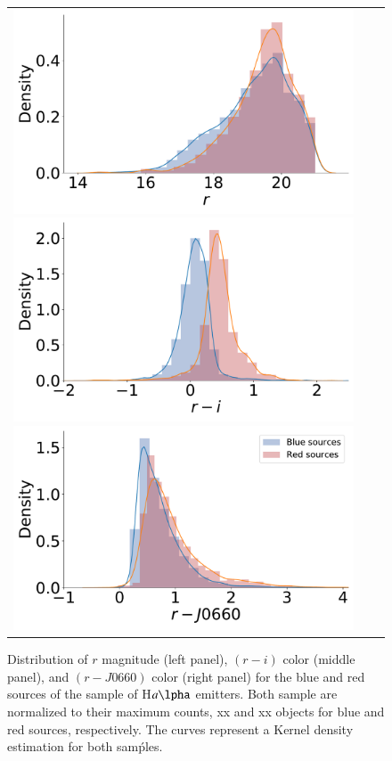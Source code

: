 \documentclass[fleqn,usenatbib]{mnras}
\begin{document}
\begin{figure}
  \begin{tabular}{l l l}
  \includegraphics[width=0.7\columnwidth]{Figs/distribution_r-group.pdf} 
    \includegraphics[width=0.7\columnwidth]{Figs/distribution-ri-group.pdf}
    \includegraphics[width=0.7\columnwidth]{Figs/distribution-Halpha-group.pdf}
  \end{tabular}
  \caption{Distribution of $r$ magnitude  (left panel), $(r - i)$ color (middle panel), and $(r - J0660)$
    color (right panel) for the blue and red sources of the sample of H$a\lpha$ emitters. Both sample are normalized to their maximum counts, xx and xx objects for blue and red sources, respectively.   The curves represent a Kernel density estimation for both samṕles.}
    \label{fig:diagram-distri}
\end{figure}
\end{document}
